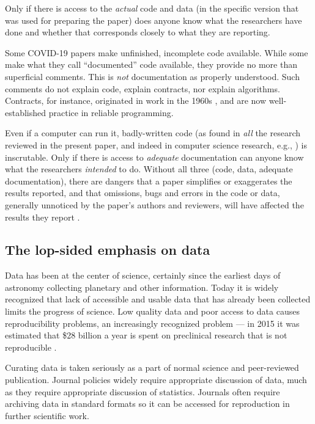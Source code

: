 \documentclass{comjnl}
\begin{document}
Only if there is access to the \emph{actual\/} code and data (in the specific version that was used for preparing the paper) does anyone know what the researchers have done and whether that corresponds closely to what they are reporting.

Some COVID-19 papers  make unfinished, incomplete code available. While some  make what they call ``documented'' code available, they provide no more than superficial comments. This is \emph{not\/} documentation as properly understood. Such comments do not explain code, explain contracts, nor explain algorithms. Contracts, for instance, originated in work in the 1960s \cite{hoare}, and are now well-established practice in reliable programming.

Even if a computer can run it, badly-written code (as found in \emph{all\/} the research reviewed in the present paper, and indeed in computer science research, e.g., \cite{machine-learning-reproducibility}) is inscrutable. Only if there is access to \emph{adequate\/} documentation can anyone know what the researchers \emph{intended\/} to do. Without all three (code, data, adequate documentation), there are dangers that a paper simplifies or exaggerates the results reported, and that omissions, bugs and errors in the code or data, generally unnoticed by the paper's authors and reviewers, will have affected the results they report \cite{relit}. 

\label{section-discussion}
\subsection{The lop-sided emphasis on data}
\label{critique-fair}
Data has been at the center of science, certainly since the earliest days of astronomy collecting planetary and other information. Today it is widely recognized that lack of accessible and usable data that has already been collected limits the progress of science. Low quality data and poor access to data causes reproducibility problems, an increasingly recognized problem --- in 2015 it was estimated that \$28 billion a year is spent on preclinical research that is not reproducible \cite{preclinical-reproducibility}.

Curating data is taken seriously as a part of normal science and peer-reviewed publication. Journal policies widely require appropriate discussion of data, much as they require appropriate discussion of statistics. Journals often require archiving data in standard formats so it can be accessed for reproduction in further scientific work. 
\end{document}

